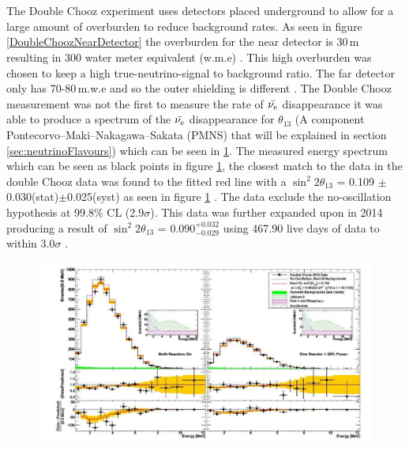 \\\\The Double Chooz experiment uses detectors placed underground to allow for a large amount of overburden to reduce background rates. As seen in figure \ref{DoubleChoozNearDetector} the overburden for the near detector is 30\,m resulting in 300 water meter equivalent (w.m.e) \cite{lasserre2006}. This high overburden was chosen to keep a high true-neutrino-signal to background ratio. The far detector only has 70-80\,m.w.e and so the outer shielding is different \cite{lasserre2006}. The Double Chooz measurement  was not the first to measure the rate of $\Bar{\nu_e}$ disappearance \cite{reno_may_2012} it was able to produce a spectrum of the $\Bar{\nu_e}$ disappearance for $\theta_{13}$ (A component Pontecorvo–Maki–Nakagawa–Sakata (PMNS) that will be explained in section \ref{sec:neutrinoFlavours}) which can be seen in \ref{doubleChoozSpectrumNoCaption}. The measured energy spectrum which can be seen as black points in figure \ref{doubleChoozSpectrumNoCaption}, the closest match to the data in the double Chooz data was found to the fitted red line with a $\sin^2{2\theta_{13}}$ = 0.109 $\pm$0.030(stat)$\pm$0.025(syst) as seen in figure \ref{doubleChoozSpectrumNoCaption} \cite{Abe_2012}. The data exclude the no-oscillation hypothesis at 99.8$\%$ CL (2.9$\sigma$)\cite{Abe_2012}. This data was further expanded upon in 2014 producing a result of $\sin^2{2\theta_{13}}$ = 0.090$^{+0.032}_{-0.029}$ using 467.90 live days of data to within $3.0\sigma$ \cite{abe2014improved}.
\begin{figure}[!h]
 \centering
 \includegraphics[width=0.8\linewidth]{Chapter2/Figs/Raster/doubleChoozSpectrumNoCaption.png} %
 \label{doubleChoozSpectrumNoCaption}
\end{figure}

